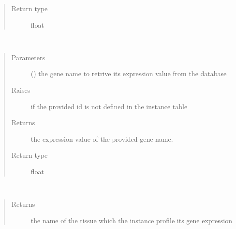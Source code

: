 \documentclass[letterpaper,10pt,english]{sphinxmanual}
\begin{document}
\begin{fulllineitems}
\begin{fulllineitems}
\begin{quote}
\begin{description}
\item[{Return type}] \leavevmode
float

\end{description}\end{quote}

\end{fulllineitems}


\begin{fulllineitems}
\label{\detokenize{IPTK.Classes:IPTK.Classes.Tissue.ExpressionProfile.get_gene_name_expression}}~\begin{quote}\begin{description}
\item[{Parameters}] \leavevmode
{} () \textendash{} the gene name to retrive its expression value from the database

\item[{Raises}] \leavevmode
{} \textendash{} if the provided id is not defined in the instance table

\item[{Returns}] \leavevmode
the expression value of the provided gene name.

\item[{Return type}] \leavevmode
float

\end{description}\end{quote}

\end{fulllineitems}


\begin{fulllineitems}
\label{\detokenize{IPTK.Classes:IPTK.Classes.Tissue.ExpressionProfile.get_name}}~\begin{quote}\begin{description}
\item[{Returns}] \leavevmode
the name of the tissue which the instance profile its gene expression


\end{description}
\end{quote}
\end{fulllineitems}
\end{fulllineitems}
\end{document}
